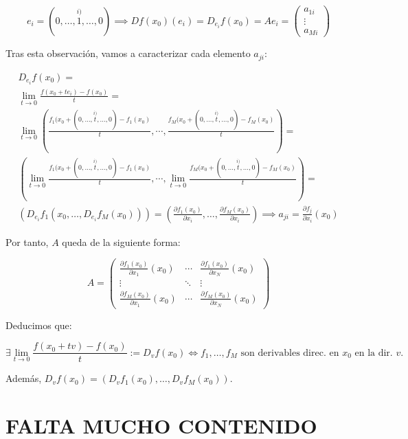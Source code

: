 \documentclass[11pt, a4paper, titlepage]{article}
\theoremstyle{theorem-style}
\theoremstyle{definition-style}
\theoremstyle{remark-style}
\theoremstyle{example-style}
\begin{document}
	\[
		e_i = (0, \dots, \stackrel{i)}{1}, \dots, 0) \implies Df(x_0)(e_i) = D_{e_i}f(x_0) = Ae_i = \begin{pmatrix}
	a_{1i}\\ \vdots\\ a_{Mi}
\end{pmatrix}
	\]

Tras esta observación, vamos a caracterizar cada elemento $a_{ji}$:

\begin{align*}
	D_{e_i}f(x_0) = \\\lim_{t\to 0} \frac{f(x_0+te_i)-f(x_0)}{t} = \\\lim_{t\to 0} \left(\frac{f_1(x_0+(0,\dots,\stackrel{i)}{t},\dots,0)-f_1(x_0)}{t},\right.\left.\cdots, \frac{f_M(x_0+(0,\dots,\stackrel{i)}{t},\dots,0)-f_M(x_0)}{t}\right)=\\
	 \left(\lim_{t\to 0} \frac{f_1(x_0+(0,\dots,\stackrel{i)}{t},\dots,0)-f_1(x_0)}{t}, \cdots, \lim_{t\to 0} \frac{f_M(x_0+(0,\dots,\stackrel{i)}{t},\dots,0)-f_M(x_0)}{t}\right) =\\
	 \left(D_{e_i}f_1(x_0, \dots, D_{e_i}f_M(x_0))\right) = \left(\frac{\partial f_1(x_0)}{\partial x_i}, \dots, \frac{\partial f_M(x_0)}{\partial x_i}\right) \implies a_{ji} = \frac{\partial f_j}{\partial x_i} (x_0)
\end{align*}

Por tanto, $A$ queda de la siguiente forma:

\[
	A = \begin{pmatrix}
	\frac{\partial f_1(x_0)}{\partial x_1} (x_0) & \cdots & \frac{\partial f_1(x_0)}{\partial x_N} (x_0)\\
	\vdots & \ddots & \vdots\\
	\frac{\partial f_M(x_0)}{\partial x_1} (x_0) & \cdots & \frac{\partial f_M(x_0)}{\partial x_N} (x_0)
\end{pmatrix}
\]

Deducimos que:

\[
	\exists \lim_{t\to 0} \frac{f(x_0+tv) - f(x_0)}{t} := D_vf(x_0) \iff f_1, \dots, f_M \text{ son derivables direc. en $x_0$ en la dir. $v$.}
\]

Además, $D_vf(x_0) = (D_vf_1(x_0), \dots, D_vf_M(x_0))$.







\section{FALTA MUCHO CONTENIDO}
\end{document}
